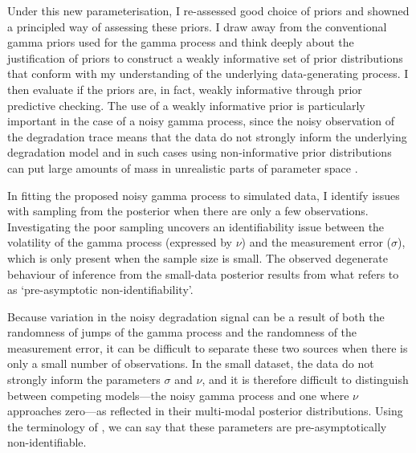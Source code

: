 Under this new parameterisation, I re-assessed good choice of priors and showned a principled way of assessing these priors. I draw away from the conventional gamma priors used for the gamma process and think deeply about the justification of priors to construct a weakly informative set of prior distributions that conform with my understanding of the underlying data-generating process. I then evaluate if the priors are, in fact, weakly informative through prior predictive checking. The use of a weakly informative prior is particularly important in the case of a noisy gamma process, since the noisy observation of the degradation trace means that the data do not strongly inform the underlying degradation model and in such cases using non-informative prior distributions can put large amounts of mass in unrealistic parts of parameter space \citep{tian2024}.

In fitting the proposed noisy gamma process to simulated data, I identify issues with sampling from the posterior when there are only a few observations. Investigating the poor sampling uncovers an identifiability issue between the volatility of the gamma process (expressed by $\nu$) and the measurement error ($\sigma$), which is only present when the sample size is small. The observed degenerate behaviour of inference from the small-data posterior results from what \citet{betancourt_2020} refers to as `pre-asymptotic non-identifiability'.

Because variation in the noisy degradation signal can be a result of both the randomness of jumps of the gamma process and the randomness of the measurement error, it can be difficult to separate these two sources when there is only a small number of observations. In the small dataset, the data do not strongly inform the parameters $\sigma$ and $\nu$, and it is therefore difficult to distinguish between competing models---the noisy gamma process and one where $\nu$ approaches zero---as reflected in their multi-modal posterior distributions. Using the terminology of \citet{betancourt_2020}, we can say that these parameters are pre-asymptotically non-identifiable.


